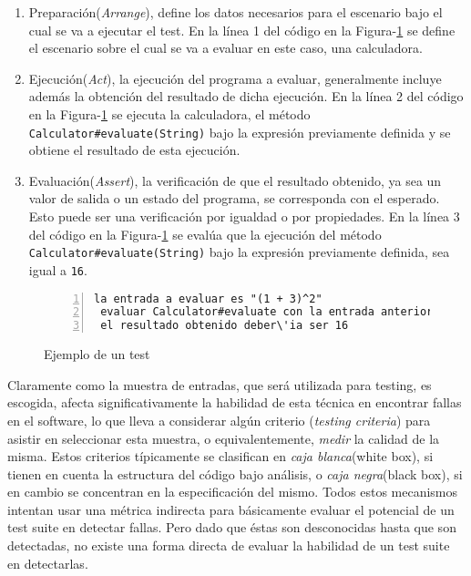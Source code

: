 \begin{enumerate}
	\item Preparaci\'on(\emph{Arrange}), define los datos necesarios para el escenario bajo el cual se va a ejecutar el test. En la l\'inea 1 del c\'odigo en la Figura-\ref{figures.examples.test.manual} se define el escenario sobre el cual se va a evaluar en este caso, una calculadora.
	
	\item Ejecuci\'on(\emph{Act}), la ejecuci\'on del programa a evaluar, generalmente incluye adem\'as la obtenci\'on del resultado de dicha ejecuci\'on. En la l\'inea 2 del c\'odigo en la Figura-\ref{figures.examples.test.manual} se ejecuta la calculadora, el m\'etodo \texttt{Calculator\#evaluate(String)} bajo la expresi\'on previamente definida y se obtiene el resultado de esta ejecuci\'on.
	
	\item Evaluaci\'on(\emph{Assert}), la verificaci\'on de que el resultado obtenido, ya sea un valor de salida o un estado del programa, se corresponda con el esperado. Esto puede ser una verificaci\'on por igualdad o por propiedades. En la l\'inea 3 del c\'odigo en la Figura-\ref{figures.examples.test.manual} se eval\'ua que la ejecuci\'on del m\'etodo \texttt{Calculator\#evaluate(String)} bajo la expresi\'on previamente definida, sea igual a \texttt{16}.
\end{enumerate}

\begin{figure}
	\begin{lstlisting}[frame=single, mathescape=true,numbers=left,framexleftmargin=1.5em]
 la entrada a evaluar es "(1 + 3)^2"
 evaluar Calculator#evaluate con la entrada anterior
 el resultado obtenido deber\'ia ser 16
	\end{lstlisting}
	\caption{Ejemplo de un test}
	\label{figures.examples.test.manual}
\end{figure}

Claramente como la muestra de entradas, que ser\'a utilizada para testing, es escogida, afecta significativamente la habilidad de esta t\'ecnica en encontrar fallas en el software, lo que lleva a considerar alg\'un criterio (\emph{testing criteria}) para asistir en seleccionar esta muestra, o equivalentemente, \emph{medir} la calidad de la misma. Estos criterios t\'ipicamente se clasifican en \emph{caja blanca}(white box), si tienen en cuenta la estructura del c\'odigo bajo an\'alisis, o \emph{caja negra}(black box), si en cambio se concentran en la especificaci\'on del mismo. Todos estos mecanismos intentan usar una m\'etrica indirecta para b\'asicamente evaluar el potencial de un test suite en detectar fallas. Pero dado que \'estas son desconocidas hasta que son detectadas, no existe una forma directa de evaluar la habilidad de un test suite en detectarlas.

